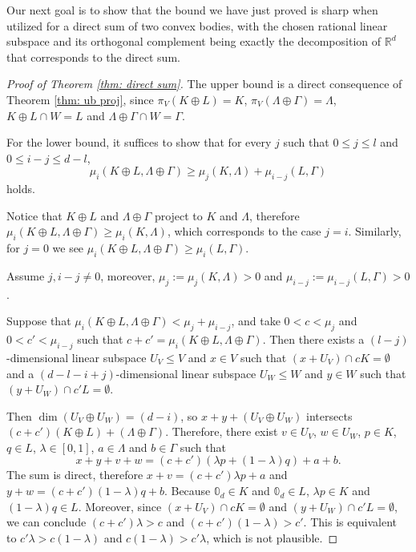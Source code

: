 \documentclass{amsart}
\theoremstyle{definition}
\theoremstyle{remark}
\newcommand{\R}{\mathbb{R}}
\begin{document}
Our next goal is to show that the bound we have just proved is sharp when utilized for a direct sum of two convex bodies, with the chosen rational linear subspace and its orthogonal complement being exactly the decomposition of $\R^d$ that corresponds to the direct sum.
\begin{proof}[Proof of Theorem \ref{thm: direct sum}]
The upper bound is a direct consequence of Theorem \ref{thm: ub proj}, since $\pi_V(K\oplus L)=K$, $\pi_V(\Lambda\oplus\Gamma)=\Lambda$, $K\oplus L \cap W= L$ and $\Lambda\oplus \Gamma\cap W =\Gamma$.

For the lower bound, it suffices to show that for every $j$ such that $0\leqslant j \leqslant l$ and $0\leqslant i-j\leqslant d-l$, 
$$\mu_i(K\oplus L, \Lambda\oplus\Gamma)\geq \mu_j(K,\Lambda)+\mu_{i-j}(L, \Gamma)$$
holds.  

Notice that $K\oplus L$ and $\Lambda\oplus\Gamma$ project to $K$ and $\Lambda$, therefore $\mu_i(K\oplus L, \Lambda\oplus\Gamma)\geq \mu_i(K,\Lambda)$, which corresponds to the case $j=i$. Similarly, for $j=0$ we see $\mu_i(K\oplus L, \Lambda\oplus\Gamma)\geq \mu_i(L,\Gamma)$.

Assume $j, i-j \neq 0$, moreover, $\mu_j:=\mu_j(K, \Lambda)>0$ and $\mu_{i-j}:=\mu_{i-j}(L,\Gamma)>0$.

Suppose that $\mu_i(K\oplus L, \Lambda\oplus\Gamma)< \mu_j+\mu_{i-j}$, and take $0<c<\mu_j$ and $0<c'<\mu_{i-j}$ such that $c+c'=\mu_i(K\oplus L, \Lambda\oplus\Gamma)$. Then there exists a $(l-j)$-dimensional linear subspace $U_V\leqslant V$ and $x\in V$ such that 
$(x+U_V)\cap cK=\emptyset$ and a $(d-l-i+j)$-dimensional linear subspace $U_W\leqslant W$ and $y\in W$ such that $(y+U_W)\cap c'L=\emptyset$.

Then $\dim(U_V\oplus U_W)=(d-i)$, so $x+y+(U_V\oplus U_W)$ intersects $(c+c')(K\oplus L) + (\Lambda\oplus\Gamma)$. Therefore, there exist $v\in U_V$, $w\in U_W$, $p\in K$, $q\in L$, $\lambda\in [0,1]$, $a\in\Lambda$ and $b\in \Gamma$ such that
$$x+y+v+w=(c+c')(\lambda p+(1-\lambda)q)+a+b.$$ 
\noindent The sum is direct, therefore $x+v=(c+c')\lambda p+a$ and $y+w=(c+c')(1-\lambda)q+b$. Because $\mathbb{0}_d\in K$ and $\mathbb{0}_d\in L$, $\lambda p\in K$ and $(1-\lambda)q\in L$. Moreover, since $(x+U_V)\cap cK=\emptyset$ and $(y+U_W)\cap c'L=\emptyset$, we can conclude $(c+c')\lambda>c$ and $(c+c')(1-\lambda)>c'$. This is equivalent to $c'\lambda>c(1-\lambda)$ and $c(1-\lambda)>c'\lambda$, which is not plausible.
\end{proof}
\end{document}
